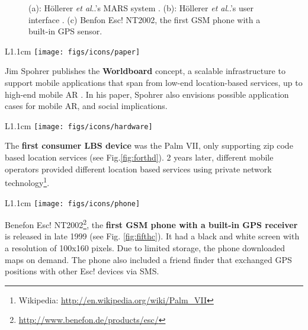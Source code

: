 \documentclass[12pt,a4paper]{article}
\makeatletter
\DeclareRobustCommand\onedot{\futurelet\@let@token\@onedot}
\def\@onedot{\ifx\@let@token.\else.\null\fi\xspace}
\def\etal{\emph{et al}\onedot}
\makeatother
\begin{document}
\begin{figure}[tbp]
\centering
\vspace{-50pt}
 \hfill
{} \hfill
{} 
\vspace{-10pt}
\caption{(a): H\"ollerer \etal's MARS system \cite{Hollerer99}. (b): H\"ollerer \etal's user interface \cite{Hollerer99b}. (c) Benfon Esc! NT2002, the first GSM phone with a built-in GPS sensor.} \label{fig:fifth}
\end{figure}

\vspace{0.1in}
\begin{wrapfigure}{L}{1.1cm}
	\vspace{-10pt}	
	\texttt{[image: figs/icons/paper]}
	\vspace{-10pt}		
\end{wrapfigure}
\noindent Jim Spohrer publishes the \textbf{Worldboard} concept, a scalable infrastructure to support mobile applications that span from low-end location-based services, up to high-end mobile AR \cite{Spohrer99}. In his paper, Spohrer also envisions possible application cases for mobile AR, and social implications.

\newpage

\begin{wrapfigure}{L}{1.1cm}
	\vspace{-5pt}	
	\texttt{[image: figs/icons/hardware]}
	\vspace{-15pt}	
\end{wrapfigure}
\noindent The \textbf{first consumer LBS device} was the Palm VII, only supporting zip code based location services (see Fig.\ref{fig:forthd}). 2 years later, different mobile operators provided different location based services using private network technology\footnote{Wikipedia: \url{http://en.wikipedia.org/wiki/Palm_VII}}. 

\vspace{0.1in}

\begin{wrapfigure}{L}{1.1cm}
	\vspace{-10pt}	
	\texttt{[image: figs/icons/phone]}
	\vspace{-20pt}		
\end{wrapfigure}
\noindent Benefon Esc! NT2002\footnote{\url{http://www.benefon.de/products/esc/}}, the \textbf{first GSM phone with a built-in GPS receiver} is released in late 1999 (see Fig. \ref{fig:fifthc}). It had a black and white screen with a resolution of 100x160 pixels. Due to limited storage, the phone downloaded maps on demand. The phone also included a friend finder that exchanged GPS positions with other Esc! devices via SMS.
\end{document}
